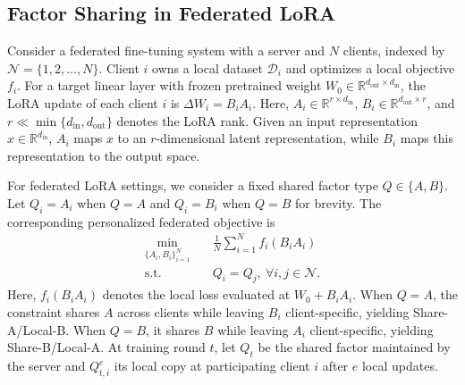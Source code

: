 \documentclass[lettersize,journal]{IEEEtran}
\begin{document}
	
	\subsection{Factor Sharing in Federated LoRA}
	\label{subsec:general_fed_lora_model}
	Consider a federated fine-tuning system with a server and $N$
	clients, indexed by $\mathcal{N}=\{1,2,\ldots,N\}$. Client $i$
	owns a local dataset $\mathcal{D}_i$ and optimizes a local
	objective $f_i$.
	For a target linear layer with frozen pretrained weight
	$W_0\in\mathbb{R}^{d_{\mathrm{out}}\times d_{\mathrm{in}}}$, the LoRA update of each client $i$ is $\Delta W_i=B_iA_i$. Here, $A_i\in\mathbb{R}^{r\times d_{\mathrm{in}}}$,
	$B_i\in\mathbb{R}^{d_{\mathrm{out}}\times r}$, and
	$r\ll\min\{d_{\mathrm{in}},d_{\mathrm{out}}\}$ denotes the LoRA
	rank. 
	Given an input representation
	$x\in\mathbb{R}^{d_{\mathrm{in}}}$, $A_i$ maps $x$ to an
	$r$-dimensional latent representation, while $B_i$ maps this
	representation to the output space.
	
	For federated LoRA settings, we consider a fixed shared factor type $Q\in\{A,B\}$. Let $Q_i=A_i$ when $Q=A$ and
	$Q_i=B_i$ when $Q=B$ for brevity. The corresponding personalized
	federated objective is
	\begin{equation}
		\begin{aligned}
			\min_{\{A_i,B_i\}_{i=1}^{N}}
			\quad&
			\frac{1}{N}
			\sum_{i=1}^{N}
			f_i(B_iA_i)
			\\
			\mathrm{s.t.}\quad&
			Q_i=Q_j,
			\
			\forall i,j\in\mathcal{N}.
		\end{aligned}
		\label{eq:personalized_fedlora_objective}
	\end{equation}
	Here, $f_i(B_iA_i)$ denotes the local loss evaluated
	at $W_0+B_iA_i$. When $Q=A$, the constraint shares $A$
	across clients while leaving $B_i$ client-specific, yielding
	Share-A/Local-B. When $Q=B$, it shares $B$ while leaving
	$A_i$ client-specific, yielding Share-B/Local-A.
	At training round $t$, let $Q_t$ be the shared
	factor maintained by the server and $Q_{t,i}^{e}$ its local
	copy at participating client $i$ after $e$ local updates.
	
\end{document}
